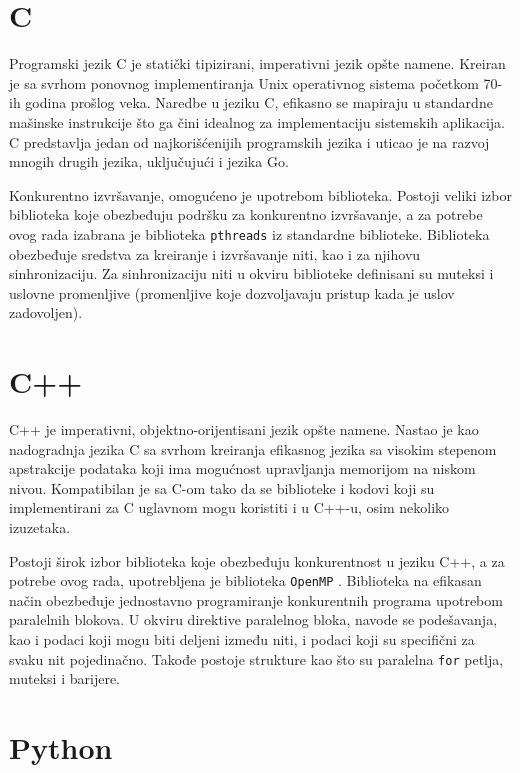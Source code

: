 \documentclass[12pt,oneside]{memoir}
\begin{document}
\section{C}

Programski jezik C je statički tipizirani, imperativni jezik opšte namene. Kreiran je sa svrhom ponovnog implementiranja Unix operativnog sistema početkom 70-ih godina prošlog veka. Naredbe u jeziku C, efikasno se mapiraju u standardne mašinske instrukcije što ga čini idealnog za implementaciju sistemskih aplikacija. C predstavlja jedan od najkorišćenijih programskih jezika i uticao je na razvoj mnogih drugih jezika, uključujući i jezika Go. 

Konkurentno izvršavanje, omogućeno je upotrebom biblioteka. Postoji veliki izbor biblioteka koje obezbeđuju podršku za konkurentno izvršavanje, a za potrebe ovog rada izabrana je biblioteka \texttt{pthreads} \cite{pthr} iz standardne biblioteke. Biblioteka obezbeđuje sredstva za kreiranje i izvršavanje niti, kao i za njihovu sinhronizaciju. Za sinhronizaciju niti u okviru biblioteke definisani su muteksi i uslovne promenljive (promenljive koje dozvoljavaju pristup kada je uslov zadovoljen). 

\section{C++}

C++ je imperativni, objektno-orijentisani jezik opšte namene. Nastao je kao nadogradnja jezika C sa svrhom kreiranja efikasnog jezika sa visokim stepenom apstrakcije podataka koji ima mogućnost upravljanja memorijom na niskom nivou. Kompatibilan je sa C-om tako da se biblioteke i kodovi koji su implementirani za C uglavnom mogu koristiti i u C++-u, osim nekoliko izuzetaka.

Postoji širok izbor biblioteka koje obezbeđuju konkurentnost u jeziku C++, a za potrebe ovog rada, upotrebljena je biblioteka \texttt{OpenMP} \cite{omp}. Biblioteka na efikasan način obezbeđuje jednostavno programiranje konkurentnih programa upotrebom paralelnih blokova. U okviru direktive paralelnog bloka, navode se podešavanja, kao i podaci koji mogu biti deljeni između niti, i podaci koji su specifični za svaku nit pojedinačno. Takođe postoje strukture kao što su paralelna \texttt{for} petlja, muteksi i barijere. 

\section{Python}
\end{document}
